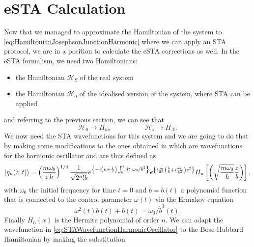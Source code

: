 \section{eSTA Calculation}
Now that we managed to approximate the Hamiltonian of the system to \cref{eq:HamiltonianJosephsonJunctionHarmonic} where we can apply an STA protocol, we are in a position to calculate the eSTA corrections as well.
In the eSTA formalism, we need two Hamiltonians: 
\begin{itemize}
	\item the Hamiltonian $ \mathcal{H}_{S} $ of the real system
	\item the Hamiltonian $ \mathcal{H}_{0} $ of the idealised version of the system, where STA can be applied
\end{itemize}
and referring to the previous section, we can see that 
\begin{equation}
	\label{eq:eSTAJJcomparison} 
	\mathcal{H}_{0} \rightarrow H_{ho} \hspace{5em} \mathcal{H}_{s} \rightarrow H_{N} .
\end{equation}
We now need the STA wavefunctions for this system and we are going to do that by making some modifications to the ones obtained in \cite{FastOptimalFrChen2010} which are wavefunctions for the harmonic oscillator and are thus defined as 
\begin{equation}
\label{eq:STAWavefunctionHarmonicOscillator}
	\ket{\eta_{n}(z,t)} = 
		\left(\frac{m\omega_{0}}{ \pi\hbar}\right)^{1/4} %
		\frac{1}{\sqrt{2^{n}!b} }e^{\left\{-i\left(n+\frac{1}{2}\right)\int_{0}^{t}dt~\omega_{0}/b^2\right\}} %
		e^{\left\{ i \frac{m}{2\hbar }\left(\frac{\dot{ b }}{b} + i\frac{\omega_{0}}{b^2}\right)z^2 \right\} } %
		H_{n}\left[\left(\sqrt{\frac{m\omega_{0}}{\hbar }} \frac{z}{b}\right)\right] %
		.
\end{equation}
with $ \omega_{0} $ the initial frequency for time $ t = 0 $ and $ b = b(t) $ a polynomial function that is connected to the control parameter $ \omega(t) $ via the Ermakov equation
\begin{equation}
\label{eq:Ermakov}
	\omega^2(t)b(t) + \dot{ b }(t) = \omega_{0}/\dot{b}^{3}(t).
\end{equation}
Finally $ H_n(x) $ is the Hermite polynomial of order $ n $.
We can adapt the wavefunction in \cref{eq:STAWavefunctionHarmonicOscillator} to the Bose Hubbard Hamiltonian by making the substitution 
